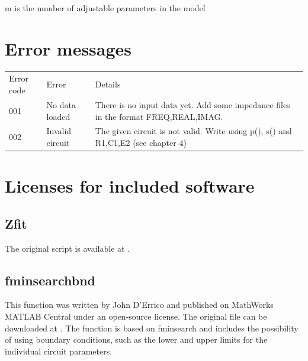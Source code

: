 \documentclass[10pt,b5paper,oneside]{book}
\begin{document}
m is the number of adjustable parameters in the model


%
%
%
%
%
%
%
%


%

\chapter{Error messages}

\begin{tabular}{llp{8cm}}
	Error code 	& Error & Details \\
	001			& No data loaded	& There is no input data yet. Add some impedance files in the format FREQ,REAL,IMAG. \\
	002			& Invalid circuit	& The given circuit is not valid. Write using p(), s() and R1,C1,E2 (see chapter 4)\\
\end{tabular}


\newpage{}
\chapter{Licenses for included software}

\section{Zfit}

The original script is available at \cite{Dellis2010}.


\section{fminsearchbnd}

This function was written by John D'Errico and published on MathWorks MATLAB Central under an open-source license. The original file can be downloaded at \cite{DErrico2012}. The function is based on fminsearch and includes the possibility of using boundary conditions, such as the lower and upper limits for the individual circuit parameters.



\end{document}
